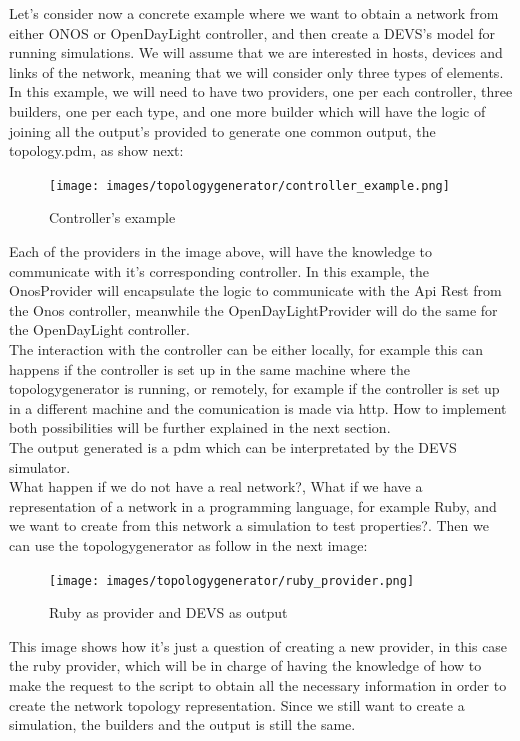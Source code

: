 Let's consider now a concrete example where we want to obtain a network from either ONOS or OpenDayLight controller, and then create a DEVS's model for running simulations. We will assume that we are interested in hosts, devices and links of the network, meaning that we will consider only three types of elements. \\
In this example, we will need to have two providers, one per each controller, three builders, one per each type, and one more builder which will have the logic of joining all the output's provided to generate one common output, the topology.pdm, as show next:

\begin{figure}[H]
\centering
\texttt{[image: images/topologygenerator/controller\_example.png]}
\caption{Controller's example}
\end{figure}

Each of the providers in the image above, will have the knowledge to communicate with it's corresponding controller. In this example, the OnosProvider will encapsulate the logic to communicate with the Api Rest from the Onos controller, meanwhile the OpenDayLightProvider will do the same for the OpenDayLight controller.\\
The interaction with the controller can be either locally, for example this can happens if the controller is set up in the same machine where the topologygenerator is running, or remotely, for example if the controller is set up in a different machine and the comunication is made via http. How to implement both possibilities will be further explained in the next section.\\
The output generated is a pdm which can be interpretated by the DEVS simulator.\\

What happen if we do not have a real network?, What if we have a representation of a network in a programming language, for example Ruby, and we want to create from this network a simulation to test properties?. Then we can use the topologygenerator as follow in the next image:

\begin{figure}[H]
\centering
\texttt{[image: images/topologygenerator/ruby\_provider.png]}
\caption{Ruby as provider and DEVS as output}
\end{figure}
 
This image shows how it's just a question of creating a new provider, in this case the ruby provider, which will be in charge of having the knowledge of how to make the request to the script to obtain all the necessary information in order to create the network topology representation. Since we still want to create a simulation, the builders and the output is still the same. \\

